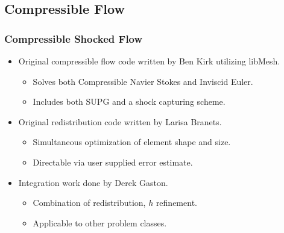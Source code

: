 \subsection*{Compressible Flow}

\frame
{
  \frametitle{Compressible Shocked Flow}
  \begin{itemize}[<+->]
    \item Original compressible flow code written by Ben Kirk utilizing libMesh.
      \begin{itemize}[<+->]
      \item Solves both Compressible Navier Stokes and Inviscid Euler.
      \item Includes both SUPG and a shock capturing scheme.
      \end{itemize}
    \item Original redistribution code written by Larisa Branets.
      \begin{itemize}[<+->]
      \item Simultaneous optimization of element shape and size.
      \item Directable via user supplied error estimate.
      \end{itemize}
    \item Integration work done by Derek Gaston.
      \begin{itemize}[<+->]
      \item Combination of redistribution, $h$ refinement.
      \item Applicable to other problem classes.
      \end{itemize}
  \end{itemize}
}

